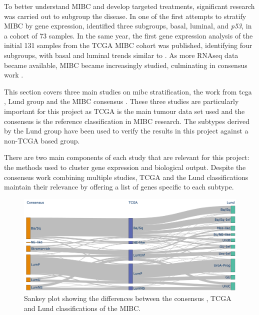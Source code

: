 
To better understand \gls{MIBC} and develop targeted treatments, significant research was carried out to subgroup the disease. In one of the first attempts to stratify MIBC by gene expression, \citet{Choi2014-ed} identified three subgroups, basal, luminal, and \textit{p53}, in a cohort of 73 samples. In the same year, the first gene expression analysis of the initial 131 samples from the \gls{TCGA} MIBC cohort was published, identifying four subgroups, with basal and luminal trends similar to \citet{Choi2014-ed}. As more RNAseq data became available, MIBC became increasingly studied, culminating in consensus work \citep{Kamoun2020-tj}.


This section covers three main studies on \acrshort{mibc} stratification, the work from \acrshort{tcga} \citep{Robertson2017-mg}, Lund group \citep{Marzouka2018-ge} and the MIBC consensus \citep{Kamoun2020-tj}. These three studies are particularly important for this project as TCGA is the main tumour data set used and the consensus is the reference classification in MIBC research. The subtypes derived by the Lund group have been used to verify the results in this project against a non-TCGA based group.

There are two main components of each study that are relevant for this project: the methods used to cluster gene expression and biological output. Despite the consensus work combining multiple studies, TCGA and the Lund classifications maintain their relevance by offering a list of genes specific to each subtype. 

\begin{figure}[!htb]   
\centering
\includegraphics[width=1.0\textwidth,height=1.0\textheight,keepaspectratio]{Sections/Lit_review/Resources/classifier_differences.png}
  \caption[Comparison between existing MIBC classifications]{Sankey plot showing the differences between the consensus \citep{Kamoun2020-tj}, TCGA \citep{Robertson2017-mg} and Lund \citep{Marzouka2018-ge} classifications of the MIBC.}
\label{fig:lit:classifier_comp}
\end{figure}

